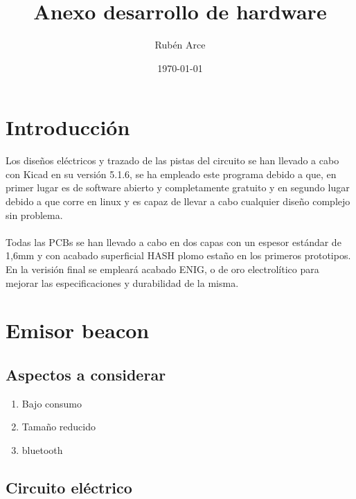 \documentclass[a4paper ,12pt, onecolumn]{article}
\begin{document}
\title{Anexo desarrollo de hardware}

\author{Rubén Arce}
\date{\today}
\maketitle
\cleardoublepage
\tableofcontents
\cleardoublepage

\section{Introducción}
    Los diseños eléctricos y trazado de las pistas del circuito se han llevado a cabo con Kicad en 
    su versión 5.1.6, se ha empleado este programa debido a que, en primer lugar es de software abierto y
    completamente gratuito y en segundo lugar debido a que corre en linux y es capaz de llevar a cabo 
    cualquier diseño complejo sin problema.
    \paragraph{}
    Todas las PCBs se han llevado a cabo en dos capas con un espesor estándar de 1,6mm y con acabado superficial
    HASH plomo estaño en los primeros prototipos. En la verisión final se empleará acabado ENIG, o de oro 
    electrolítico para mejorar las especificaciones y durabilidad de la misma.
\section{Emisor beacon}
    \subsection{Aspectos a considerar}
        \begin{enumerate}
            \item Bajo consumo
            \item Tamaño reducido
            \item bluetooth
        \end{enumerate}
    \subsection{Circuito eléctrico}
\end{document}
